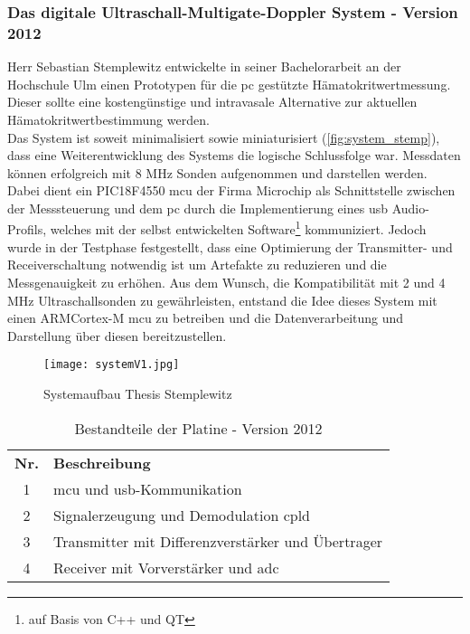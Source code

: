 \subsubsection*{Das digitale Ultraschall-Multigate-Doppler System - Version 2012}\label{cp:usdV1}
Herr Sebastian Stemplewitz entwickelte in seiner Bachelorarbeit an der Hochschule Ulm einen Prototypen für die \ac{pc} gestützte Hämatokritwertmessung. Dieser sollte eine kostengünstige und intravasale Alternative zur aktuellen Hämatokritwertbestimmung werden.\\
Das System ist soweit minimalisiert sowie miniaturisiert (\autoref{fig:system_stemp}), dass eine Weiterentwicklung des Systems die logische Schlussfolge war. Messdaten können erfolgreich mit 8 MHz Sonden aufgenommen und darstellen werden. Dabei dient ein PIC18F4550 \ac{mcu} der Firma Microchip als Schnittstelle zwischen der Messsteuerung und dem \ac{pc} durch die Implementierung eines \ac{usb} Audio-Profils, welches mit der selbst entwickelten Software\footnote{auf Basis von C++ und QT} kommuniziert. Jedoch wurde in der Testphase festgestellt, dass eine Optimierung der Transmitter- und Receiverschaltung notwendig ist um Artefakte zu reduzieren und die Messgenauigkeit zu erhöhen. Aus dem Wunsch, die Kompatibilität mit 2 und 4 MHz Ultraschallsonden zu gewährleisten, entstand die Idee dieses System mit einen ARM\SymbReg Cortex\SymbReg-M \ac{mcu} zu betreiben und die Datenverarbeitung und Darstellung über diesen bereitzustellen.\cite{stemp2012}
\begin{figure}[h!t]
\centering
\begin{annotatedFigure}
	{\texttt{[image: systemV1.jpg]}}
\end{annotatedFigure}
	\caption{Systemaufbau Thesis Stemplewitz}
  	\label{fig:system_stemp}
\end{figure}
\vfill
\begin{table}[h!]
\centering
\caption{Bestandteile der Platine - Version 2012}
\label{tab:system_stemp_tab}
\begin{tabular}{c|l}
\textbf{Nr.} & \textbf{Beschreibung} \\
\cline{1-2}
1 & \ac{mcu} und \ac{usb}-Kommunikation\\ 
2 & Signalerzeugung und Demodulation \ac{cpld}\\ 
3 & Transmitter mit Differenzverstärker und Übertrager\\ 
4 & Receiver mit Vorverstärker und \ac{adc}\\ 
\end{tabular}
\end{table}

